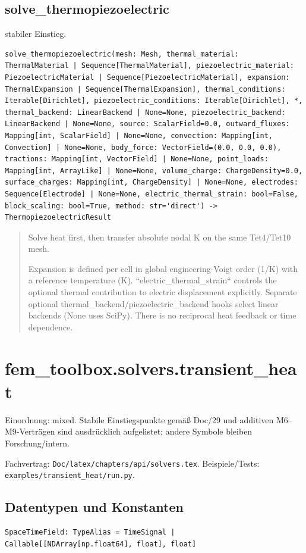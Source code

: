 \subsection{solve\_thermopiezoelectric}
stabiler Einstieg.
\begin{lstlisting}
solve_thermopiezoelectric(mesh: Mesh, thermal_material: ThermalMaterial | Sequence[ThermalMaterial], piezoelectric_material: PiezoelectricMaterial | Sequence[PiezoelectricMaterial], expansion: ThermalExpansion | Sequence[ThermalExpansion], thermal_conditions: Iterable[Dirichlet], piezoelectric_conditions: Iterable[Dirichlet], *, thermal_backend: LinearBackend | None=None, piezoelectric_backend: LinearBackend | None=None, source: ScalarField=0.0, outward_fluxes: Mapping[int, ScalarField] | None=None, convection: Mapping[int, Convection] | None=None, body_force: VectorField=(0.0, 0.0, 0.0), tractions: Mapping[int, VectorField] | None=None, point_loads: Mapping[int, ArrayLike] | None=None, volume_charge: ChargeDensity=0.0, surface_charges: Mapping[int, ChargeDensity] | None=None, electrodes: Sequence[Electrode] | None=None, electric_thermal_strain: bool=False, block_scaling: bool=True, method: str='direct') -> ThermopiezoelectricResult
\end{lstlisting}
\begin{quote}
Solve heat first, then transfer absolute nodal K on the same Tet4/Tet10 mesh.\par Expansion is defined per cell in global engineering-Voigt order (1/K) with a reference temperature (K). ``electric\_thermal\_strain`` controls the optional thermal contribution to electric displacement explicitly. Separate optional thermal\_backend/piezoelectric\_backend hooks select linear backends (None uses SciPy). There is no reciprocal heat feedback or time dependence.
\end{quote}
\section{fem\_toolbox.solvers.transient\_heat}
Einordnung: mixed. Stabile Einstiegspunkte gemäß Doc/29 und additiven M6–M9-Verträgen sind ausdrücklich aufgelistet; andere Symbole bleiben Forschung/intern.
\par Fachvertrag: \nolinkurl{Doc/latex/chapters/api/solvers.tex}. Beispiele/Tests:
\nolinkurl{examples/transient_heat/run.py}.
\subsection*{Datentypen und Konstanten}
\begin{lstlisting}
SpaceTimeField: TypeAlias = TimeSignal | Callable[[NDArray[np.float64], float], float]
\end{lstlisting}
